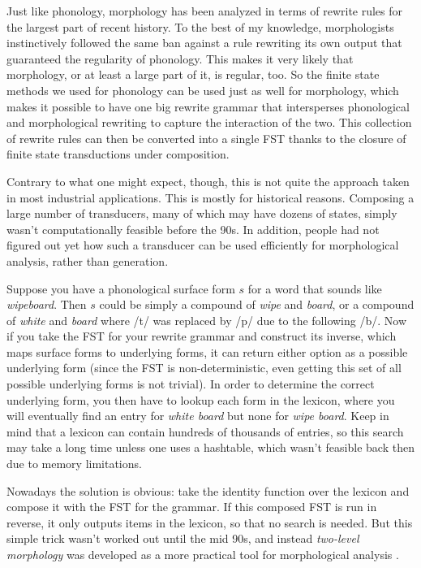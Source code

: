 Just like phonology, morphology has been analyzed in terms of rewrite rules for the largest part of recent history.
To the best of my knowledge, morphologists instinctively followed the same ban against a rule rewriting its own output that guaranteed the regularity of phonology.
This makes it very likely that morphology, or at least a large part of it, is regular, too.
So the finite state methods we used for phonology can be used just as well for morphology, which makes it possible to have one big rewrite grammar that intersperses phonological and morphological rewriting to capture the interaction of the two.
This collection of rewrite rules can then be converted into a single FST thanks to the closure of finite state transductions under composition.

Contrary to what one might expect, though, this is not quite the approach taken in most industrial applications.
This is mostly for historical reasons.
Composing a large number of transducers, many of which may have dozens of states, simply wasn't computationally feasible before the 90s.
In addition, people had not figured out yet how such a transducer can be used efficiently for morphological analysis, rather than generation.

Suppose you have a phonological surface form $s$ for a word that sounds like \emph{wipeboard}.
Then $s$ could be simply a compound of \emph{wipe} and \emph{board}, or a compound of \emph{white} and \emph{board} where /t/ was replaced by /p/ due to the following /b/.
Now if you take the FST for your rewrite grammar and construct its inverse, which maps surface forms to underlying forms, it can return either option as a possible underlying form (since the FST is non-deterministic, even getting this set of all possible underlying forms is not trivial).
In order to determine the correct underlying form, you then have to lookup each form in the lexicon, where you will eventually find an entry for \emph{white board} but none for \emph{wipe board}.
Keep in mind that a lexicon can contain hundreds of thousands of entries, so this search may take a long time unless one uses a hashtable, which wasn't feasible back then due to memory limitations.

Nowadays the solution is obvious: take the identity function over the lexicon and compose it with the FST for the grammar.
If this composed FST is run in reverse, it only outputs items in the lexicon, so that no search is needed.
But this simple trick wasn't worked out until the mid 90s, and instead \emph{two-level morphology} was developed as a more practical tool for morphological analysis \citep{Koskenniemi83}.

